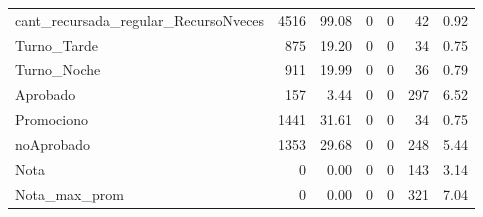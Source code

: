 \begin{table}[!h]
{\begin{tabular}[t]{lrrrrrr}
			\addlinespace
			cant\_recursada\_regular\_RecursoNveces & 4516 & 99.08 & 0 & 0 & 42 & 0.92\\
			\rowcolor{gray!6}  Turno\_Tarde & 875 & 19.20 & 0 & 0 & 34 & 0.75\\
			Turno\_Noche & 911 & 19.99 & 0 & 0 & 36 & 0.79\\
			\rowcolor{gray!6}  Aprobado & 157 & 3.44 & 0 & 0 & 297 & 6.52\\
			Promociono & 1441 & 31.61 & 0 & 0 & 34 & 0.75\\
			\addlinespace
			\rowcolor{gray!6}  noAprobado & 1353 & 29.68 & 0 & 0 & 248 & 5.44\\
			Nota & 0 & 0.00 & 0 & 0 & 143 & 3.14\\
			\rowcolor{gray!6}  Nota\_max\_prom & 0 & 0.00 & 0 & 0 & 321 & 7.04\\
			\bottomrule
	\end{tabular}}
\end{table}